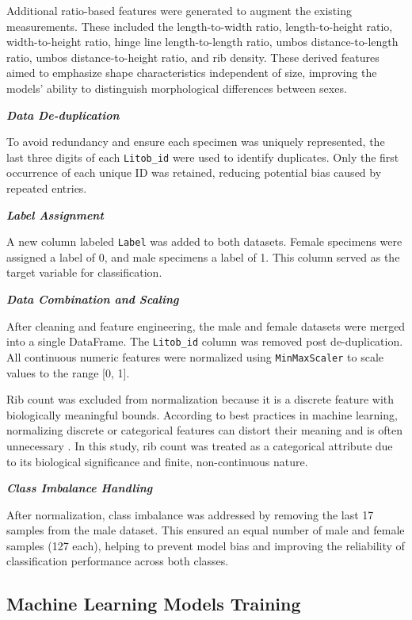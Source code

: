 Additional ratio-based features were generated to augment the existing measurements. These included the length-to-width ratio, length-to-height ratio, width-to-height ratio, hinge line length-to-length ratio, umbos distance-to-length ratio, umbos distance-to-height ratio, and rib density. These derived features aimed to emphasize shape characteristics independent of size, improving the models' ability to distinguish morphological differences between sexes.

\textbf{\textit{Data De-duplication}}

To avoid redundancy and ensure each specimen was uniquely represented, the last three digits of each \texttt{Litob\_id} were used to identify duplicates. Only the first occurrence of each unique ID was retained, reducing potential bias caused by repeated entries.

\newpage
\textbf{\textit{Label Assignment}}

A new column labeled \texttt{Label} was added to both datasets. Female specimens were assigned a label of 0, and male specimens a label of 1. This column served as the target variable for classification.

\textbf{\textit{Data Combination and Scaling}}

After cleaning and feature engineering, the male and female datasets were merged into a single DataFrame. The \texttt{Litob\_id} column was removed post de-duplication. All continuous numeric features were normalized using \texttt{MinMaxScaler} to scale values to the range [0, 1].

Rib count was excluded from normalization because it is a discrete feature with biologically meaningful bounds. According to best practices in machine learning, normalizing discrete or categorical features can distort their meaning and is often unnecessary \cite{jaiswal2024}. In this study, rib count was treated as a categorical attribute due to its biological significance and finite, non-continuous nature.

\textbf{\textit{Class Imbalance Handling}}

After normalization, class imbalance was addressed by removing the last 17 samples from the male dataset. This ensured an equal number of male and female samples (127 each), helping to prevent model bias and improving the reliability of classification performance across both classes.

\subsection{Machine Learning Models Training}

